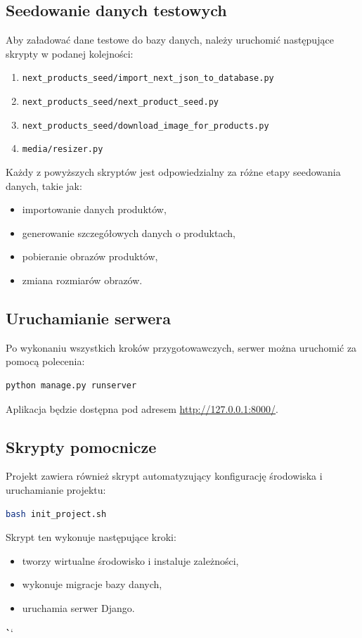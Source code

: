 \documentclass[12pt,a4paper,oneside]{article}
\theoremstyle{definition}
\numberwithin{equation}{section}
\begin{document}
\subsection{Seedowanie danych testowych}

Aby załadować dane testowe do bazy danych, należy uruchomić następujące skrypty w podanej kolejności:
\begin{enumerate}
    \item \texttt{next\_products\_seed/import\_next\_json\_to\_database.py}
    \item \texttt{next\_products\_seed/next\_product\_seed.py}
    \item \texttt{next\_products\_seed/download\_image\_for\_products.py}
    \item \texttt{media/resizer.py}
\end{enumerate}

Każdy z powyższych skryptów jest odpowiedzialny za różne etapy seedowania danych, takie jak:
\begin{itemize}
    \item importowanie danych produktów,
    \item generowanie szczegółowych danych o produktach,
    \item pobieranie obrazów produktów,
    \item zmiana rozmiarów obrazów.
\end{itemize}

\subsection{Uruchamianie serwera}

Po wykonaniu wszystkich kroków przygotowawczych, serwer można uruchomić za pomocą polecenia:
\begin{lstlisting}[language=bash]
python manage.py runserver
\end{lstlisting}
Aplikacja będzie dostępna pod adresem \url{http://127.0.0.1:8000/}.

\subsection{Skrypty pomocnicze}

Projekt zawiera również skrypt automatyzujący konfigurację środowiska i uruchamianie projektu:
\begin{lstlisting}[language=bash]
bash init_project.sh
\end{lstlisting}
Skrypt ten wykonuje następujące kroki:
\begin{itemize}
    \item tworzy wirtualne środowisko i instaluje zależności,
    \item wykonuje migracje bazy danych,
    \item uruchamia serwer Django.
\end{itemize}
\```
\end{document}

